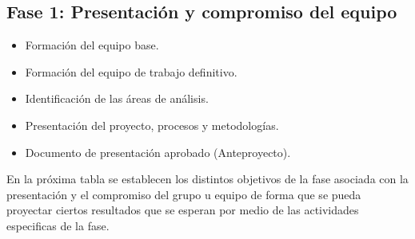 {}
\subsection*{Fase 1: Presentación y compromiso del equipo}


\begin{itemize}
	\item Formación del equipo base.
	
	\item Formación del equipo de trabajo definitivo.
	
	\item Identificación de las áreas de análisis.
	
	\item Presentación del proyecto, procesos y metodologías.
	
	\item Documento de presentación aprobado (Anteproyecto). 
\end{itemize}

En la próxima tabla se establecen los distintos objetivos de la fase asociada con la presentación y el compromiso del grupo u equipo de forma que se pueda proyectar ciertos resultados que se esperan por medio de las actividades especificas de la fase.

